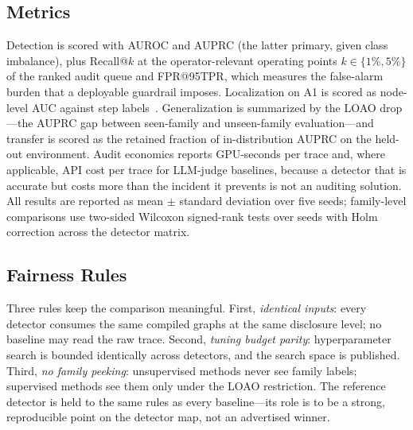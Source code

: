\subsection{Metrics}
\label{sec:bench-metrics}

Detection is scored with AUROC and AUPRC (the latter primary, given class imbalance), plus Recall@$k$ at the operator-relevant operating points $k \in \{1\%, 5\%\}$ of the ranked audit queue and FPR@95TPR, which measures the false-alarm burden that a deployable guardrail imposes. Localization on A1 is scored as node-level AUC against step labels~\cite{pinjari2026agentdrift}. Generalization is summarized by the LOAO drop---the AUPRC gap between seen-family and unseen-family evaluation---and transfer is scored as the retained fraction of in-distribution AUPRC on the held-out environment. Audit economics reports GPU-seconds per trace and, where applicable, API cost per trace for LLM-judge baselines, because a detector that is accurate but costs more than the incident it prevents is not an auditing solution. All results are reported as mean $\pm$ standard deviation over five seeds; family-level comparisons use two-sided Wilcoxon signed-rank tests over seeds with Holm correction across the detector matrix.

\subsection{Fairness Rules}
\label{sec:bench-fairness}

Three rules keep the comparison meaningful. First, \emph{identical inputs}: every detector consumes the same compiled graphs at the same disclosure level; no baseline may read the raw trace. Second, \emph{tuning budget parity}: hyperparameter search is bounded identically across detectors, and the search space is published. Third, \emph{no family peeking}: unsupervised methods never see family labels; supervised methods see them only under the LOAO restriction. The reference detector is held to the same rules as every baseline---its role is to be a strong, reproducible point on the detector map, not an advertised winner.
